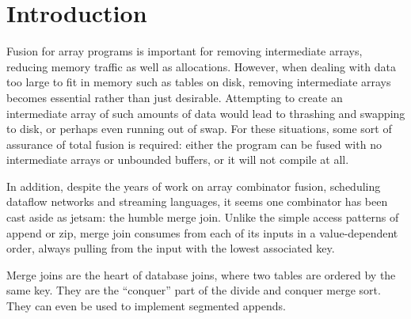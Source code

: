 \section{Introduction}
\label{s:Introduction}

Fusion for array programs is important for removing intermediate arrays, reducing memory traffic as well as allocations.
However, when dealing with data too large to fit in memory such as tables on disk, removing intermediate arrays becomes essential rather than just desirable.
Attempting to create an intermediate array of such amounts of data would lead to thrashing and swapping to disk, or perhaps even running out of swap.
For these situations, some sort of assurance of total fusion is required: either the program can be fused with no intermediate arrays or unbounded buffers, or it will not compile at all.

In addition, despite the years of work on array combinator fusion, scheduling dataflow networks and streaming languages, it seems one combinator has been cast aside as jetsam: the humble merge join.
Unlike the simple access patterns of append or zip, merge join consumes from each of its inputs in a value-dependent order, always pulling from the input with the lowest associated key.

Merge joins are the heart of database joins, where two tables are ordered by the same key.
They are the ``conquer'' part of the divide and conquer merge sort.
They can even be used to implement segmented appends.





